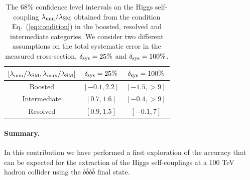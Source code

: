 \documentclass[a4paper,10pt]{article}
\newcommand{\lc}{\left[}
\newcommand{\rc}{\right]}
\begin{document}
\begin{table}[h]
  \centering
  \begin{tabular}{|c|c|c|}
    \hline
  $\lc \lambda_{\rm min}/\lambda_{\rm SM},\lambda_{\rm max}/\lambda_{\rm SM} \rc$  &  $\delta_{\rm sys}=25\%$ & $\delta_{\rm sys}=100\%$ \\
    \hline
    \hline
Boosted   & $\lc -0.1, 2.2\rc$  & $\lc -1.5, > 9\rc$  \\
\hline
Intermediate   & $\lc 0.7, 1.6\rc$  &  $\lc -0.4, > 9\rc$  \\
\hline
Resolved   & $\lc 0.9, 1.5\rc$  &  $\lc -0.1, 7\rc$  \\
\hline
  \end{tabular}
  \caption{\label{tab:chi2} The 68\% confidence level intervals
    on the Higgs self-coupling $\lambda_{\rm min}/\lambda_{\rm SM}$ obtained from the condition
    Eq.~(\ref{eq:condition}) in the boosted, resolved and intermediate categories.
    We consider two different assumptions on the total systematic error in the measured
    cross-section,  $\delta_{\rm sys}=25\%$ and $\delta_{\rm sys}=100\%$.
  }
  \end{table}
  
\paragraph{Summary.} In this contribution we have performed a first exploration of the accuracy that can be expected
for the extraction of the Higgs self-couplings at a 100 TeV hadron collider using the $b\bar{b}b\bar{b}$ final state. 



\end{document}

